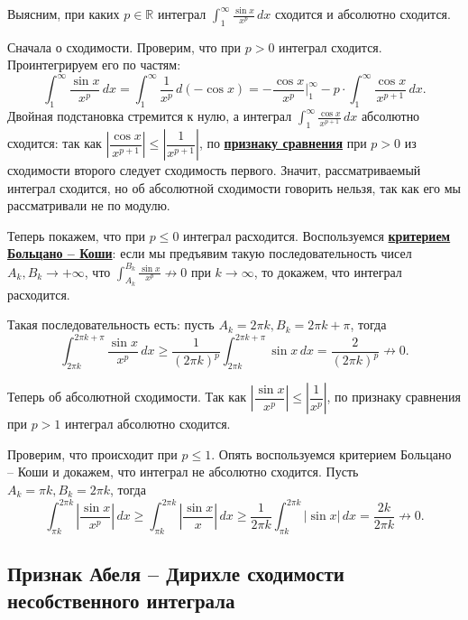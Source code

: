 \begin{example}
	Выясним, при каких \(p \in \mathbb{R}\) интеграл \(\displaystyle \int_1^{\infty} \frac{\sin x}{x^p} \, dx\) сходится и абсолютно сходится.
	
	Сначала о сходимости. Проверим, что при \(p > 0\) интеграл сходится. Проинтегрируем его по частям: \[
		\int_1^{\infty} \frac{\sin x}{x^p} \, dx = \int_{1}^{\infty} \frac{1}{x^p} \, d(-\cos x) = -\frac{\cos x}{x^p} \bigg|_1^\infty - p \cdot \int_{1}^{\infty} \frac{\cos x}{x^{p+1}} \, dx.
	\]
	Двойная подстановка стремится к нулю, а интеграл \(\displaystyle \int_{1}^{\infty} \frac{\cos x}{x^{p+1}} \, dx\) абсолютно сходится: так как \(\left|\dfrac{\cos x}{x^{p+1}} \right| \leqslant \left|\dfrac{1}{x^{p+1}} \right|\), по \hyperlink{priz}{\bfseries признаку сравнения} при \(p > 0\) из сходимости второго следует сходимость первого. Значит, рассматриваемый интеграл сходится, но об абсолютной сходимости говорить нельзя, так как его мы рассматривали не по модулю.
	
	Теперь покажем, что при \(p \leqslant 0\) интеграл расходится. Воспользуемся \hyperlink{Критерий Больцано -- Коши сходимости несобственного интеграла}{\bfseries критерием Больцано -- Коши}: если мы предъявим такую последовательность чисел \(A_k, B_k \to +\infty\), что \(\displaystyle \int_{A_k}^{B_k} \frac{\sin x}{x^p} \not\to 0\) при \(k \to \infty\), то докажем, что интеграл расходится.
	
	Такая последовательность есть: пусть \(A_k = 2\pi k, B_k = 2\pi k + \pi\), тогда \[
		\int_{2\pi k}^{2\pi k + \pi} \frac{\sin x}{x^p} \, dx \geqslant \frac{1}{(2\pi k)^p} \int_{2\pi k}^{2\pi k + \pi} \sin x \, dx = \frac{2}{(2\pi k)^p} \not\to 0.
	\]
	
	Теперь об абсолютной сходимости. Так как \(\left|\dfrac{\sin x}{x^p}\right| \leqslant \left|\dfrac{1}{x^p}\right|\), по признаку сравнения при \(p > 1\) интеграл абсолютно сходится.
	
	Проверим, что происходит при \(p \leqslant 1\). Опять воспользуемся критерием Больцано -- Коши и докажем, что интеграл не абсолютно сходится. Пусть \(A_k = \pi k, B_k = 2 \pi k\), тогда \[
		\int_{\pi k}^{2\pi k} \left|\frac{\sin x}{x^p} \right| \, dx \geqslant \int_{\pi k}^{2\pi k} \left|\frac{\sin x}{x} \right| \, dx \geqslant \frac{1}{2\pi k} \int_{\pi k}^{2\pi k} \left|\sin x \right| \, dx = \frac{2k}{2\pi k} \not\to 0.
	\]
\end{example}

\subsection{Признак Абеля -- Дирихле сходимости несобственного интеграла}

